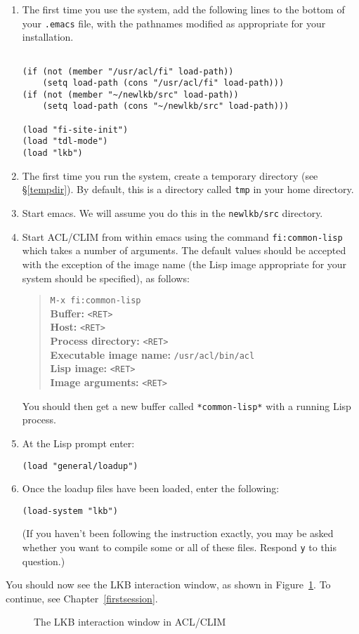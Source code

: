 \documentclass[12pt]{report}
\begin{document}
\begin{enumerate}
\item The first time you use the system,
add the following lines to the bottom of your {\tt .emacs}
file, with the pathnames modified as appropriate for your
installation.
\begin{verbatim}

(if (not (member "/usr/acl/fi" load-path))
    (setq load-path (cons "/usr/acl/fi" load-path)))
(if (not (member "~/newlkb/src" load-path))
    (setq load-path (cons "~/newlkb/src" load-path)))
	
(load "fi-site-init")
(load "tdl-mode")
(load "lkb")
\end{verbatim}
\item The first time you run the system,
create a temporary directory (see \S\ref{tempdir}).  By default, this is
a directory called {\tt tmp} in your home directory.
\item Start emacs.  We will assume you
do this in the {\tt newlkb/src} directory.
\item Start ACL/CLIM from within emacs using the 
command \verb+fi:common-lisp+ which takes a number
of arguments. The
default values should be accepted with the exception
of the image name (the Lisp image appropriate for your
system should be specified), as follows:
\begin{quote}
\verb+M-x fi:common-lisp+\\
{\bf Buffer:} \verb+<RET>+\\
{\bf Host:} \verb+<RET>+\\
{\bf Process directory:} \verb+<RET>+\\
{\bf Executable image name:} \verb+/usr/acl/bin/acl+\\
{\bf Lisp image:}  \verb+<RET>+\\
{\bf Image arguments:}  \verb+<RET>+
\end{quote}
You should then get a new buffer called \verb+*common-lisp*+ with
a running Lisp process.  
\item At the Lisp prompt enter:
\begin{verbatim}
(load "general/loadup") 
\end{verbatim}
\item Once the loadup files have been loaded, enter the following:
\begin{verbatim}
(load-system "lkb")
\end{verbatim}
(If you haven't been following the instruction exactly, you may be asked whether
you want to compile some or all of these files.  Respond {\tt y} to this
question.)
\end{enumerate}
You
should now see the LKB interaction window, as shown in 
Figure~\ref{lkbtop-unix}.
To continue, see Chapter~\ref{firstsession}.
\begin{figure}
\caption{The LKB interaction window in ACL/CLIM}
\label{lkbtop-unix}
\end{figure}
\end{document}
